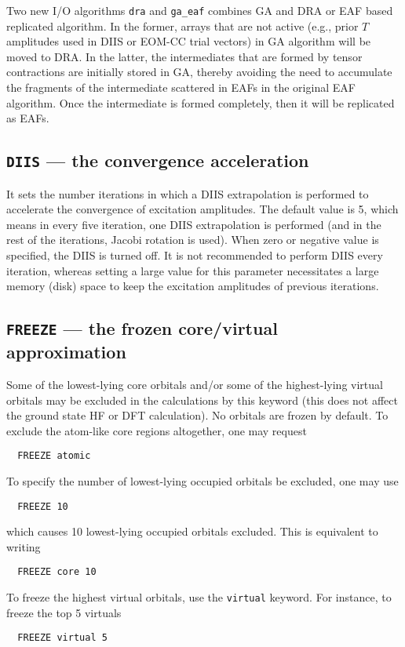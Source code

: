 Two new I/O algorithms \verb+dra+ and \verb+ga_eaf+ combines GA and DRA or EAF based replicated 
algorithm.  In the former, arrays that are not active (e.g., prior $T$ amplitudes used in DIIS
or EOM-CC trial vectors) in GA algorithm will be moved to DRA.  In the latter, the intermediates
that are formed by tensor contractions are initially stored in GA, thereby avoiding the need to
accumulate the fragments of the intermediate scattered in EAFs in the original EAF algorithm.
Once the intermediate is formed completely, then it will be replicated as EAFs.

\subsection{{\tt DIIS} --- the convergence acceleration}

It sets the number iterations in which a DIIS extrapolation is performed to accelerate
the convergence of excitation amplitudes.  The default value is 5, which means in every
five iteration, one DIIS extrapolation is performed (and in the rest of the iterations,
Jacobi rotation is used).  When zero or negative value is specified, the DIIS is turned
off.  It is not recommended to perform DIIS every iteration, whereas setting a large 
value for this parameter necessitates a large memory (disk) space to keep the excitation
amplitudes of previous iterations.

\subsection{{\tt FREEZE} --- the frozen core/virtual approximation}

Some of the lowest-lying core orbitals and/or some of the highest-lying
virtual orbitals may be excluded in the calculations
by this keyword (this does not affect the ground state HF or DFT calculation).
No orbitals are frozen by default.  To exclude the atom-like
core regions altogether, one may request
\begin{verbatim}
  FREEZE atomic
\end{verbatim}
To specify the number of lowest-lying occupied orbitals be excluded, one may use
\begin{verbatim}
  FREEZE 10
\end{verbatim}
which causes 10 lowest-lying occupied orbitals excluded.
This is equivalent to writing
\begin{verbatim}
  FREEZE core 10
\end{verbatim}
To freeze the highest virtual orbitals, use the \verb+virtual+
keyword.  For instance, to freeze the top 5 virtuals
\begin{verbatim}
  FREEZE virtual 5
\end{verbatim}

